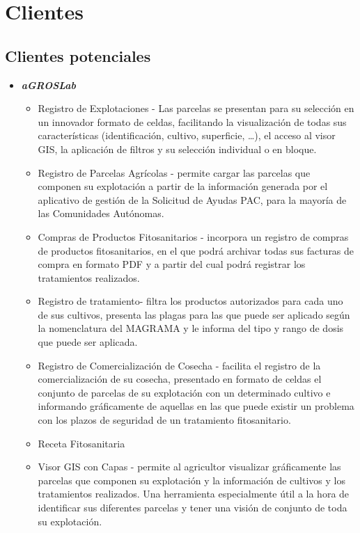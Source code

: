 \chapter{Clientes} \label{b.clientes}
\section{Clientes potenciales} \label{b.clientes.potenciales}
\begin{itemize}
\item \textbf{\textit{aGROSLab}} \cite{agroslab}
\begin{itemize}
\item Registro de Explotaciones - Las parcelas se presentan para su selección en un innovador formato de celdas, facilitando la visualización de todas sus características (identificación, cultivo, superficie, …), el acceso al visor GIS, la aplicación de filtros y su selección individual o en bloque.
\item Registro de Parcelas Agrícolas - permite cargar las parcelas que componen su explotación a partir de la información generada por el aplicativo de gestión de la Solicitud de Ayudas PAC, para la mayoría de las Comunidades Autónomas.
\item Compras de Productos Fitosanitarios - incorpora un registro de compras de productos fitosanitarios, en el que podrá archivar todas sus facturas de compra en formato PDF y a partir del cual podrá registrar los tratamientos realizados.
\item Registro de \gls{tratamiento}- filtra los productos autorizados para cada uno de sus cultivos, presenta las plagas para las que puede ser aplicado según la nomenclatura del MAGRAMA y le informa del tipo y rango de dosis que puede ser aplicada.
\item Registro de Comercialización de Cosecha - facilita el registro de la comercialización de su cosecha, presentado en formato de celdas el conjunto de parcelas de su explotación con un determinado cultivo e informando gráficamente de aquellas en las que puede existir un problema con los plazos de seguridad de un tratamiento fitosanitario.
\item Receta Fitosanitaria 
\item Visor GIS con Capas - permite al agricultor visualizar gráficamente las parcelas que componen su explotación y la información de cultivos y los tratamientos realizados. Una herramienta especialmente útil a la hora de identificar sus diferentes parcelas y tener una visión de conjunto de toda su explotación.

\end{itemize}
\end{itemize}
